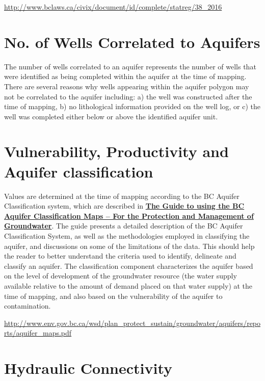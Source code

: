 \documentclass[11pt,]{article}
\let\oldhref\href
\renewcommand{\href}[2]{\oldhref{#1}{\bfseries#2}}
\begin{document}
\url{http://www.bclaws.ca/civix/document/id/complete/statreg/38_2016}

\section{No. of Wells Correlated to
Aquifers}\label{no.-of-wells-correlated-to-aquifers}

The number of wells correlated to an aquifer represents the number of
wells that were identified as being completed within the aquifer at the
time of mapping. There are several reasons why wells appearing within
the aquifer polygon may not be correlated to the aquifer including: a)
the well was constructed after the time of mapping, b) no lithological
information provided on the well log, or c) the well was completed
either below or above the identified aquifer unit.

\section{Vulnerability, Productivity and Aquifer
classification}\label{vulnerability-productivity-and-aquifer-classification}

Values are determined at the time of mapping according to the BC Aquifer
Classification system, which are described in
\href{http://www.env.gov.bc.ca/wsd/plan_protect_sustain/groundwater/aquifers/reports/aquifer_maps.pdf}{The
Guide to using the BC Aquifer Classification Maps -- For the Protection
and Management of Groundwater}. The guide presents a detailed
description of the BC Aquifer Classification System, as well as the
methodologies employed in classifying the aquifer, and discussions on
some of the limitations of the data. This should help the reader to
better understand the criteria used to identify, delineate and classify
an aquifer. The classification component characterizes the aquifer based
on the level of development of the groundwater resource (the water
supply available relative to the amount of demand placed on that water
supply) at the time of mapping, and also based on the vulnerability of
the aquifer to contamination.

\url{http://www.env.gov.bc.ca/wsd/plan_protect_sustain/groundwater/aquifers/reports/aquifer_maps.pdf}

\section{Hydraulic Connectivity}\label{hydraulic-connectivity}
\end{document}

